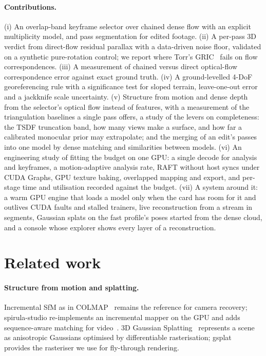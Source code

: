 \documentclass[10pt,a4paper,twocolumn]{article}
\begin{document}
\paragraph{Contributions.}
(i) An overlap-band keyframe selector over chained dense flow with an explicit multiplicity model, and pass segmentation for edited footage.
(ii) A per-pass 3D verdict from direct-flow residual parallax with a data-driven noise floor, validated on a synthetic pure-rotation control; we report where Torr's GRIC~\cite{torr1998gric} fails on flow correspondences.
(iii) A measurement of chained versus direct optical-flow correspondence error against exact ground truth.
(iv) A ground-levelled 4-DoF georeferencing rule with a significance test for sloped terrain, leave-one-out error and a jackknife scale uncertainty.
(v) Structure from motion and dense depth from the selector's optical flow instead of features, with a measurement of the triangulation baselines a single pass offers, a study of the levers on completeness: the TSDF truncation band, how many views make a surface, and how far a calibrated monocular prior may extrapolate; and the merging of an edit's passes into one model by dense matching and similarities between models.
(vi) An engineering study of fitting the budget on one GPU: a single decode for analysis and keyframes, a motion-adaptive analysis rate, RAFT without host syncs under CUDA Graphs, GPU texture baking, overlapped mapping and export, and per-stage time and utilisation recorded against the budget.
(vii) A system around it: a warm GPU engine that loads a model only when the card has room for it and outlives CUDA faults and stalled trainers, live reconstruction from a stream in segments, Gaussian splats on the fast profile's poses started from the dense cloud, and a console whose explorer shows every layer of a reconstruction.

\section{Related work}
\paragraph{Structure from motion and splatting.}
Incremental SfM as in COLMAP~\cite{schoenberger2016sfm} remains the reference for camera recovery; spirula-studio re-implements an incremental mapper on the GPU and adds sequence-aware matching for video~\cite{spirulastudio}. 3D Gaussian Splatting~\cite{kerbl2023gaussians} represents a scene as anisotropic Gaussians optimised by differentiable rasterisation; gsplat~\cite{ye2025gsplat} provides the rasteriser we use for fly-through rendering.
\end{document}
